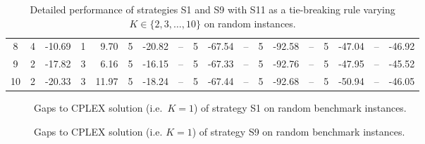 \documentclass[11pt]{article}
\begin{document}
\begin{table}[!ht]
\begin{center}
{\begin{tabular}{|c|rrrr|rrrr|rrrr|rrrr|rrrr|r|}
8 & 4 & -10.69 & 1 & {9.70} & 5 & -20.82 & \multicolumn{2}{c|}{--} & 5 & -67.54 & \multicolumn{2}{c|}{--} & 5 & -92.58 & \multicolumn{2}{c|}{--} & 5 & -47.04 & \multicolumn{2}{c|}{--} & {-46.92} \\
9 & 2 & -17.82 & 3 & {6.16} & 5 & -16.15 & \multicolumn{2}{c|}{--} & 5 & -67.33 & \multicolumn{2}{c|}{--} & 5 & -92.76 & \multicolumn{2}{c|}{--} & 5 & -47.95 & \multicolumn{2}{c|}{--} & {-45.52} \\
10 & 2 & -20.33 & 3 & {11.97} & 5 & -18.24 & \multicolumn{2}{c|}{--} & 5 & -67.44 & \multicolumn{2}{c|}{--} & 5 & -92.68 & \multicolumn{2}{c|}{--} & 5 & -50.94 & \multicolumn{2}{c|}{--} & -46.05 \\
\hline
\end{tabular}}
\end{center}
\caption{Detailed performance of strategies S1 and S9 with S11 as a tie-breaking rule varying $K \in \{2, 3, \dots, 10\}$ on random instances.}
\label{tab4}
\end{table}

\begin{figure}[!ht]
\centering
\begin{center}

\end{center}
\caption{Gaps to CPLEX solution (i.e.\ $K=1$) of strategy S1 on random benchmark instances.}
\label{fig3}
\end{figure}

\begin{figure}[!ht]
\centering
\begin{center}

\end{center}
\caption{Gaps to CPLEX solution (i.e. $K=1$) of strategy S9 on random benchmark instances.}
\label{fig4}
\end{figure}
\end{document}
